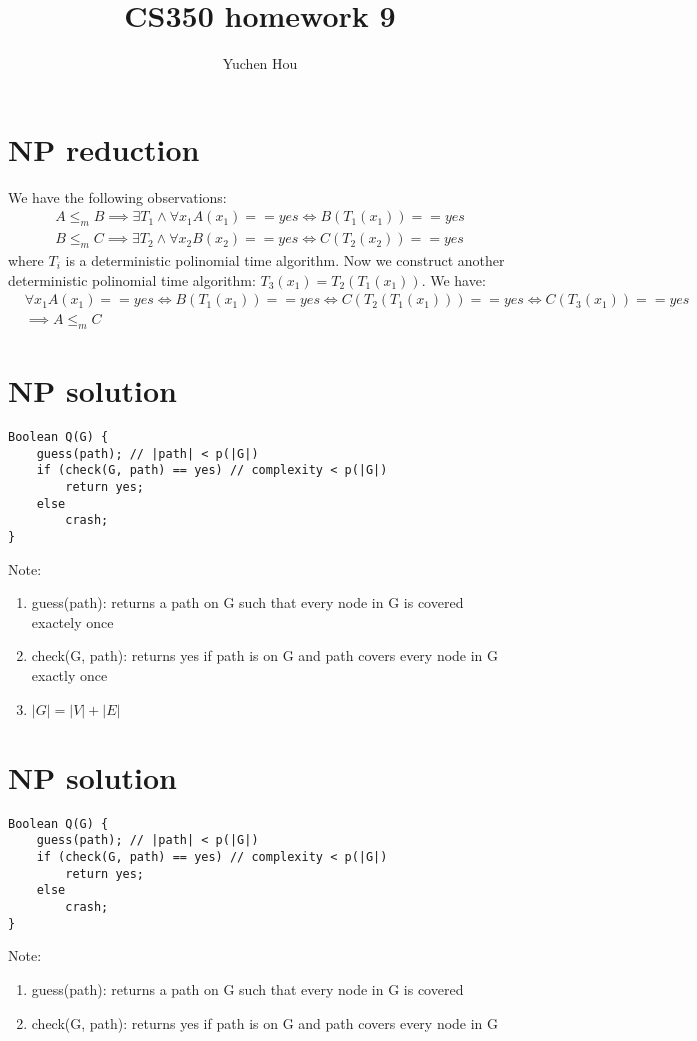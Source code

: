\documentclass{article}
\begin{document}
\lstset{language=Java, tabsize=4}
\title{CS350 homework 9}
\author{Yuchen Hou}
\maketitle

\section{NP reduction}
We have the following observations:
\begin{align*}
A \leq_m B \implies \exists T_1 \land \forall x_1 A(x_1) == yes \iff B(T_1(x_1))
== yes \\
B \leq_m C \implies \exists T_2 \land \forall x_2 B(x_2) == yes \iff C(T_2(x_2))
== yes
\end{align*}
where $T_i$ is a deterministic polinomial time algorithm. Now we construct
another deterministic polinomial time algorithm: $T_3(x_1) = T_2(T_1(x_1))$. We
have:
\begin{align*}
&\forall x_1 A(x_1) == yes \iff B(T_1(x_1)) == yes \iff C(T_2(T_1(x_1))) == yes
\iff C(T_3(x_1)) == yes \\
&\implies A \leq_m C
\end{align*}

\section{NP solution}
\begin{lstlisting}
Boolean Q(G) {
	guess(path); // |path| < p(|G|)
	if (check(G, path) == yes) // complexity < p(|G|)
		return yes;
	else
		crash;
}
\end{lstlisting}
Note:
\begin{enumerate}
  \item guess(path): returns a path on G such that every node in G is covered
  exactely once
  \item check(G, path): returns yes if path is on G and path covers every node
  in G exactly once
  \item $|G| = |V| + |E|$
\end{enumerate}

\section{NP solution}
\begin{lstlisting}
Boolean Q(G) {
	guess(path); // |path| < p(|G|)
	if (check(G, path) == yes) // complexity < p(|G|)
		return yes;
	else
		crash;
}
\end{lstlisting}
Note:
\begin{enumerate}
  \item guess(path): returns a path on G such that every node in G is covered
  \item check(G, path): returns yes if path is on G and path covers every node
  in G
\end{enumerate}
\end{document}
